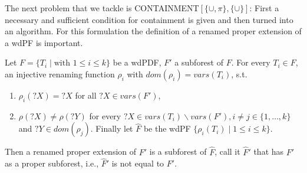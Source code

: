 The next problem that we tackle is CONTAINMENT$[\{\cup,\pi\},\{\cup\}]$: First
a necessary and sufficient condition for containment is given and then turned
into an algorithm. For this formulation the definition of a renamed proper
extension of a wdPF is important.
\begin{definition}
	Let $F = \{ T_i \mid \mbox{with } 1\leq i \leq k\}$ be a wdPDF, $F'$ a
	subforest of $F$. For every $T_i \in F$, an injective renaming function
	$\rho_i$ with $dom(\rho_i) = vars(T_i)$, s.t. 
	\begin{enumerate}
		\item $\rho_i(?X) = ?X$ for all $?X \in vars(F')$,
		\item $\rho(?X) \neq \rho(?Y)$ for every $?X \in vars(T_i) \backslash
			vars(F'),i\neq j \in \{ 1, \dots, k\}$ and $?Y \in dom(\rho_j)$.
			Finally let $\hat{F}$ be the wdPF $\{ \rho_i(T_i) \mid 1 \leq i \leq
			k\}$. 
	\end{enumerate}
	Then a renamed proper extension of $F'$ is a subforest of
	$\hat{F}$, call it $\hat{F}'$ that has $F'$ as a proper subforest, i.e.,
	$\hat{F}'$ is not equal to $F'$.
\end{definition}

